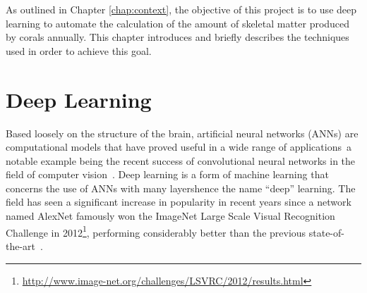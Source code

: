 


As outlined in Chapter \ref{chap:context}, the objective of this project is to use deep learning to automate the calculation of the amount of skeletal matter produced by corals annually. This chapter introduces and briefly describes the techniques used in order to achieve this goal.

\section{Deep Learning}
\label{sec:deeplearning}

Based loosely on the structure of the brain, artificial neural networks (ANNs) are computational models that have proved useful in a wide range of applications~\cite{lecun2015deep, healthcare, nlp}\textemdash a notable example being the recent success of convolutional neural networks in the field of computer vision~\cite{compvision, semanticsegreview}. Deep learning is a form of machine learning that concerns the use of ANNs with many layers\textemdash hence the name ``deep'' learning. The field has seen a significant increase in popularity in recent years since a network named AlexNet famously won the ImageNet Large Scale Visual Recognition Challenge in 2012\footnote{\url{http://www.image-net.org/challenges/LSVRC/2012/results.html}}, performing considerably better than the previous state-of-the-art~\cite{alexnet}.

